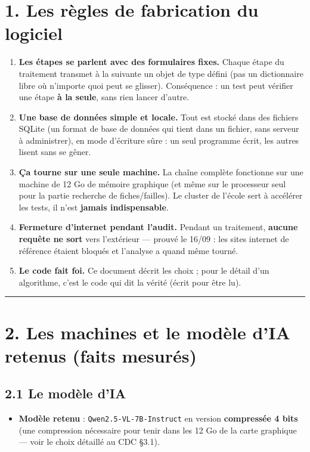 \documentclass[11pt,a4paper]{article}
\begin{document}
\section*{1. Les règles de fabrication du logiciel}
\begin{enumerate}  \item \textbf{Les étapes se parlent avec des formulaires fixes.} Chaque étape du traitement transmet à la suivante un objet de type défini (pas un dictionnaire libre où n'importe quoi peut se glisser). Conséquence : un test peut vérifier une étape \textbf{à la seule}, sans rien lancer d'autre.
  \item \textbf{Une base de données simple et locale.} Tout est stocké dans des fichiers SQLite (un format de base de données qui tient dans un fichier, sans serveur à administrer), en mode d'écriture sûre : un seul programme écrit, les autres lisent sans se gêner.
  \item \textbf{Ça tourne sur une seule machine.} La chaîne complète fonctionne sur une machine de 12 Go de mémoire graphique (et même sur le processeur seul pour la partie recherche de fiches/failles). Le cluster de l'école sert à accélérer les tests, il n'est \textbf{jamais indispensable}.
  \item \textbf{Fermeture d'internet pendant l'audit.} Pendant un traitement, \textbf{aucune requête ne sort} vers l'extérieur — prouvé le 16/09 : les sites internet de référence étaient bloqués et l'analyse a quand même tourné.
  \item \textbf{Le code fait foi.} Ce document décrit les choix ; pour le détail d'un algorithme, c'est le code qui dit la vérité (écrit pour être lu).
\end{enumerate}

\medskip\hrule\medskip
\section*{2. Les machines et le modèle d'IA retenus (faits mesurés)}
\subsection*{2.1 Le modèle d'IA}
\begin{itemize}  \item \textbf{Modèle retenu} : \texttt{Qwen2.5-VL-7B-Instruct} en version \textbf{compressée 4 bits} (une compression nécessaire pour tenir dans les 12 Go de la carte graphique — voir le choix détaillé au CDC §3.1).
\end{itemize}
\end{document}
